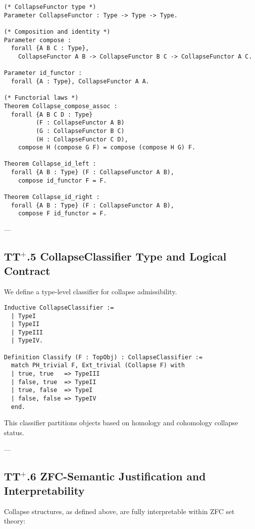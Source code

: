 \documentclass[11pt]{article}
\begin{document}
\begin{lstlisting}[language=Coq]
(* CollapseFunctor type *)
Parameter CollapseFunctor : Type -> Type -> Type.

(* Composition and identity *)
Parameter compose :
  forall {A B C : Type},
    CollapseFunctor A B -> CollapseFunctor B C -> CollapseFunctor A C.

Parameter id_functor :
  forall {A : Type}, CollapseFunctor A A.

(* Functorial laws *)
Theorem Collapse_compose_assoc :
  forall {A B C D : Type}
         (F : CollapseFunctor A B)
         (G : CollapseFunctor B C)
         (H : CollapseFunctor C D),
    compose H (compose G F) = compose (compose H G) F.

Theorem Collapse_id_left :
  forall {A B : Type} (F : CollapseFunctor A B),
    compose id_functor F = F.

Theorem Collapse_id_right :
  forall {A B : Type} (F : CollapseFunctor A B),
    compose F id_functor = F.
\end{lstlisting}

---

\subsection*{TT$^{+}$.5 CollapseClassifier Type and Logical Contract}

We define a type-level classifier for collapse admissibility.

\begin{lstlisting}[language=Coq]
Inductive CollapseClassifier :=
  | TypeI
  | TypeII
  | TypeIII
  | TypeIV.

Definition Classify (F : TopObj) : CollapseClassifier :=
  match PH_trivial F, Ext_trivial (Collapse F) with
  | true, true   => TypeIII
  | false, true  => TypeII
  | true, false  => TypeI
  | false, false => TypeIV
  end.
\end{lstlisting}

This classifier partitions objects based on homology and cohomology collapse status.

---

\subsection*{TT$^{+}$.6 ZFC-Semantic Justification and Interpretability}

Collapse structures, as defined above, are fully interpretable within ZFC set theory:
\end{document}
